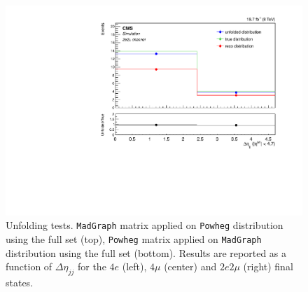 \begin{figure}[hbtp]
\begin{center}
    \includegraphics[width=0.8\cmsFigWidth]{Figures/Unfolding/MCTests/Deta_ZZTo2e2m_PowMatrix_MadDistr_FullSample_fr}  
 \caption{Unfolding tests. \texttt{MadGraph} matrix applied on \texttt{Powheg} distribution using the full set (top), \texttt{Powheg} matrix applied on \texttt{MadGraph} distribution using the full set (bottom). Results are reported as a function of $\Delta\eta_{jj}$ for the $4e$ (left), $4\mu$ (center) and $2e2\mu$ (right) final states.}
    \label{fig:MCtest_Deta2}
  \end{center}
\end{figure}
\clearpage 
